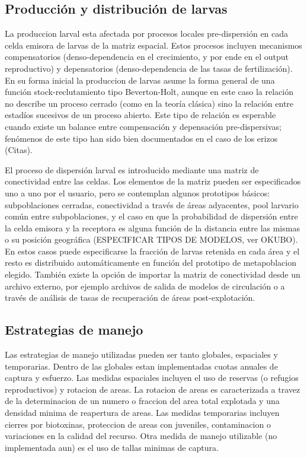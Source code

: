 \documentclass[12pt, oneside, a4paper]{article}
\begin{document}
		\subsection{Producción y distribución de larvas}

			La produccion larval esta afectada por  procesos locales pre-dispersión en cada celda emisora de larvas de la matriz espacial. Estos procesos incluyen mecanismos compensatorios (denso-dependencia en el crecimiento, y por ende en el output reproductivo) y depensatorios (denso-dependencia de las tasas de fertilización). En su forma inicial la produccion de larvas asume la forma general de una función stock-reclutamiento tipo Beverton-Holt, aunque en este caso la relación no describe un proceso cerrado (como en la teoría clásica) sino la relación entre estadíos sucesivos de un proceso abierto. Este tipo de relación es esperable cuando existe un balance entre compensación y depensación pre-dispersivas; fenómenos de este tipo han sido bien documentados en el caso de los erizos (Citas).

			El proceso de dispersión larval es introducido mediante una matriz de conectividad entre las celdas. Los elementos de la matriz pueden ser especificados uno a uno por el usuario, pero se contemplan algunos prototipos básicos: subpoblaciones cerradas, conectividad a través de áreas adyacentes, pool larvario común entre subpoblaciones, y el caso en que la probabilidad de dispersión entre la celda emisora y la receptora es alguna función de la distancia entre las mismas o su posición geográfica (ESPECIFICAR TIPOS DE MODELOS, ver OKUBO). En estos casos puede especificarse la fracción de larvas retenida en cada área y el resto es distribuido automáticamente en función del prototipo de metapoblacion elegido. También existe la opción de importar la matriz de conectividad desde un archivo externo, por ejemplo archivos de salida de modelos de circulación o a través de análisis de tasas de recuperación de áreas post-explotación.

		\subsection{Estrategias de manejo}

			Las estrategias de manejo utilizadas pueden ser  tanto globales, espaciales y temporarias.
Dentro de las globales estan implementadas cuotas anuales de captura  y esfuerzo. Las medidas espaciales incluyen el uso de reservas (o refugios reproductivos) y rotacion de areas. La rotacion de areas es caracterizada a travez de la determinacion de un numero o fraccion del area total explotada y una densidad minima de reapertura de areas. Las medidas temporarias incluyen cierres por biotoxinas, proteccion de areas con juveniles, contaminacion o variaciones en la calidad del recurso. Otra medida de manejo utilizable (no implementada aun) es el uso de tallas minimas de captura.
\end{document}

